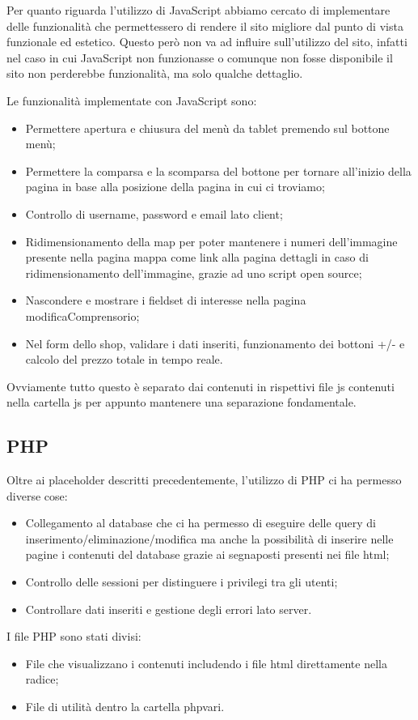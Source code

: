 Per quanto riguarda l'utilizzo di JavaScript abbiamo cercato di implementare delle funzionalità che permettessero di rendere il sito migliore dal punto di vista funzionale ed estetico.
Questo però non va ad influire sull'utilizzo del sito, infatti nel caso in cui JavaScript non funzionasse o comunque non fosse disponibile il sito non perderebbe funzionalità, ma solo qualche dettaglio.

Le funzionalità implementate con JavaScript sono:
\begin{itemize}
    \item Permettere apertura e chiusura del menù da tablet premendo sul bottone menù;
    \item Permettere la comparsa e la scomparsa del bottone per tornare all'inizio della pagina in base alla posizione della pagina in cui ci troviamo;
    \item Controllo di username, password e email lato client;
    \item Ridimensionamento della map per poter mantenere i numeri dell'immagine presente nella pagina mappa come link alla pagina dettagli in caso di ridimensionamento dell'immagine, grazie ad uno script open source;
    \item Nascondere e mostrare i fieldset di interesse nella pagina modificaComprensorio;
    \item Nel form dello shop, validare i dati inseriti, funzionamento dei bottoni +/- e calcolo del prezzo totale in tempo reale.
\end{itemize}

Ovviamente tutto questo è separato dai contenuti in rispettivi file js contenuti nella cartella js per appunto mantenere una separazione fondamentale.

\subsection{PHP}

Oltre ai placeholder descritti precedentemente, l'utilizzo di PHP ci ha permesso diverse cose:
\begin{itemize}
    \item Collegamento al database che ci ha permesso di eseguire delle query di inserimento/eliminazione/modifica ma anche la possibilità
        di inserire nelle pagine i contenuti del database grazie ai segnaposti presenti nei file html;
    \item Controllo delle sessioni per distinguere i privilegi tra gli utenti;
    \item Controllare dati inseriti e gestione degli errori lato server.
\end{itemize}

I file PHP sono stati divisi:
\begin{itemize}
    \item File che visualizzano i contenuti includendo i file html direttamente nella radice;
    \item File di utilità dentro la cartella php\textunderscore vari.
\end{itemize}